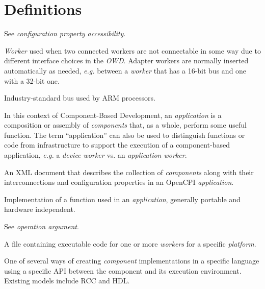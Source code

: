 \section{Definitions}
\begin{description}[style=nextline]
\item[Accessibility]
See \textit{configuration property accessibility}.

\item[Adapter Worker]
\textit{Worker} used when two connected workers are not connectable in some way due to different interface choices in the \textit{OWD}.
Adapter workers are normally inserted automatically as needed, \textit{e.g.} between a \textit{worker} that has a 16-bit bus and one with a 32-bit one.

\item[Advanced eXtensible Interface (AXI)]
Industry-standard bus used by ARM processors.

\item[Application]
\subitem[noun] In this context of Component-Based Development, an \textit{application} is a composition or assembly of \textit{components} that, as a whole, perform some useful function.
\subitem[adjective] The term ``application'' can also be used to distinguish functions or code from infrastructure to support the execution of a component-based application, \textit{e.g.} a \textit{device worker} vs. an \textit{application worker}.

\item[Application Specification (OAS)]
An XML document that describes the collection of \textit{components} along with their interconnections and configuration properties in an OpenCPI \textit{application}.

\item[Application Worker]
Implementation of a function used in an \textit{application}, generally portable and hardware independent.

\item[Argument]
See \textit{operation argument}.

\item[Artifact]
A file containing executable code for one or more \textit{workers}  for a specific \textit{platform}.

\item[Authoring Model]
One of several ways of creating \textit{component} implementations in a specific language using a specific API between the component and its execution environment.  Existing models include RCC and HDL. %


\end{description}
